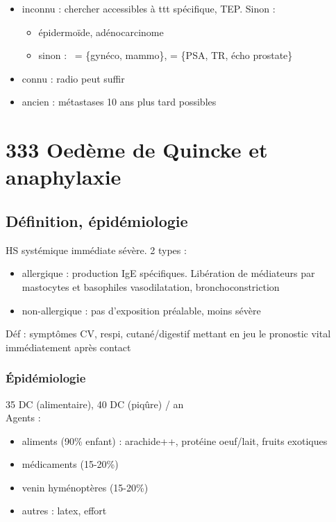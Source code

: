 \documentclass{book}
\begin{document}
\begin{itemize}
\item inconnu : chercher accessibles à ttt spécifique, TEP. Sinon :

\begin{itemize}
\item épidermoïde, adénocarcinome
\item sinon : \female{} = \{gynéco, mammo\}, \male{} = \{PSA, TR, écho prostate\}
\end{itemize}

\item connu : radio peut suffir
\item ancien : métastases 10 ans plus tard possibles
\end{itemize}

\section{333 \textdagger{} Oedème de Quincke et anaphylaxie}
\label{sec:orgbb5ce2f}
\label{sec:333_oedeme_de_quincke_et_anaphylaxie}

\subsection{Définition, épidémiologie}
\label{sec:org067efef}
HS systémique immédiate sévère. 2 types :

\begin{itemize}
\item allergique : production IgE spécifiques. Libération de médiateurs par
mastocytes et basophiles \thus vasodilatation, bronchoconstriction
\item non-allergique : pas d'exposition préalable, moins sévère
\end{itemize}

Déf : symptômes CV, respi, cutané/digestif mettant en
jeu le pronostic vital immédiatement après contact

\subsubsection{Épidémiologie}
\label{sec:org4269965}
35 DC (alimentaire), 40 DC (piqûre) / an\\
Agents :

\begin{itemize}
\item aliments (90\% enfant) : arachide++, protéine oeuf/lait, fruits exotiques
\item médicaments (15-20\%)
\item venin hyménoptères (15-20\%)
\item autres : latex, effort
\end{itemize}
\end{document}
